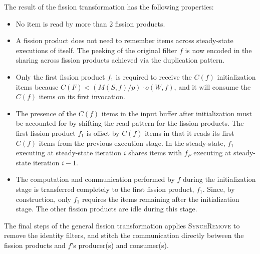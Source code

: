 The result of the fission transformation has the following properties:
\begin{itemize}
\item No item is read by more than 2 fission products.
\item A fission product does not need to remember items across
  steady-state executions of itself. The peeking of the original
  filter $f$ is now encoded in the sharing across fission products
  achieved via the duplication pattern.
\item Only the first fission product $f_1$ is required to receive the $C(f)$
  initialization  items because $C(F) < (M(S,f) / p) \cdot o(W, f)$,
  and it will consume the $C(f)$ items on its first invocation.
\item The presence of the $C(f)$ items in the input buffer after
  initialization must be accounted for by shifting the read pattern
  for the fission products.  The first fission product $f_1$ is offset by
  $C(f)$ items in that it reads its first $C(f)$ items from the
  previous execution stage.  In the steady-state, $f_1$ executing at
  steady-state iteration $i$ shares items with $f_P$ executing at
  steady-state iteration $i-1$.
\item The computation and communication performed by $f$ during the
  initialization stage is transferred completely to the first fission
  product, $f_1$.  Since, by construction, only $f_1$ requires the
  items remaining after the initialization stage.  The other fission
  products are idle during this stage.
\end{itemize}

The final steps of the general fission transformation applies
\textsc{SynchRemove} to remove the identity filters, and stitch the
communication directly between the fission products and $f$'s
producer(s) and consumer(s).
 
